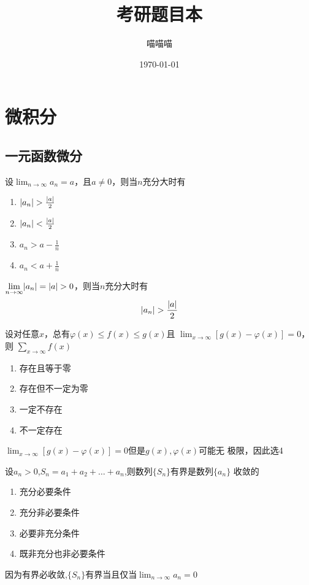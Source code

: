 \documentclass{article}
\author{喵喵喵}
\date{\today}
\title{考研题目本}
\begin{document}
\maketitle
\tableofcontents


\section{微积分}
\label{sec:orga7ba88e}
\subsection{一元函数微分}
\label{sec:orge4aadfe}
\begin{examplle}[]
设\(\displaystyle\lim_{n\to\infty}a_n=a\)，且\(a\neq0\)，则当\(n\)充分大时有
\begin{enumerate}
\item \(\abs{a_n}\iffalse<\fi>\frac{\abs{a}}{2}\)
\item \(\abs{a_n}<\frac{\abs{a}}{2}\)
\item \(a_n\iffalse<\fi>a-\frac{1}{n}\)
\item \(a_n<a+\frac{1}{n}\)
\end{enumerate}

\(\displaystyle\lim_{n\to\infty}\abs{a_n}=\abs{a}>0\)，则当\(n\)充分大时有
\begin{equation*}
\abs{a_n}>\frac{\abs{a}}{2}
\end{equation*}
\end{examplle}

\begin{examplle}[]
设对任意\(x\)，总有\(\varphi(x)\le f(x)\le g(x)\)且
\(\displaystyle\lim_{x\to\infty}[g(x)-\varphi(x)]=0\)，则
\(\displaystyle\sum_{x\to\infty}f(x)\)
\begin{enumerate}
\item 存在且等于零
\item 存在但不一定为零
\item 一定不存在
\item 不一定存在
\end{enumerate}


\(\displaystyle\lim_{x\to\infty}[g(x)-\varphi(x)]=0\)但是\(g(x),\varphi(x)\)可能无
极限，因此选4
\end{examplle}

\begin{examplle}[]
设\(a_n>0\),\(S_n=a_1+a_2+\dots+a_n\),则数列\(\{S_n\}\)有界是数列\(\{a_n\}\)
收敛的
\begin{enumerate}
\item 充分必要条件
\item 充分非必要条件
\item 必要非充分条件
\item 既非充分也非必要条件
\end{enumerate}


因为有界必收敛,\(\{S_n\}\)有界当且仅当\(\displaystyle\lim_{n\to\infty}a_n=0\)
\end{examplle}
\end{document}
